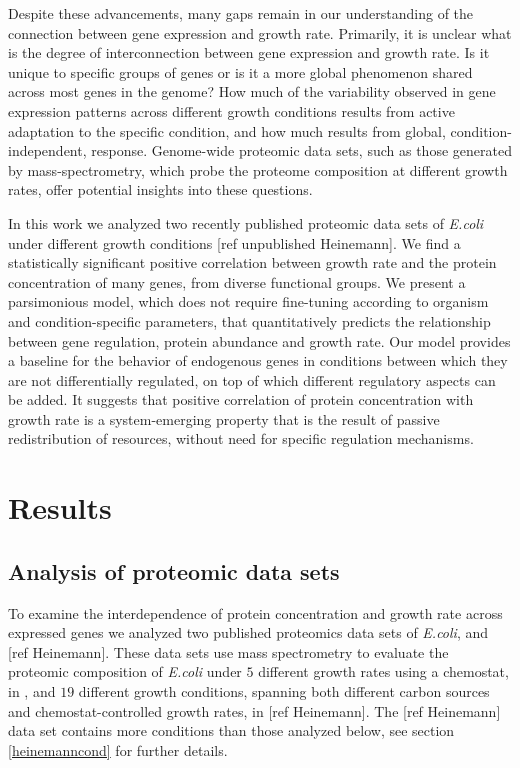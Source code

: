 \documentclass[notitlepage]{article}
\begin{document}
Despite these advancements, many gaps remain in our understanding of the connection between gene expression and growth rate.
Primarily, it is unclear what is the degree of interconnection between gene expression and growth rate.
Is it unique to specific groups of genes or is it a more global phenomenon shared across most genes in the genome?
How much of the variability observed in gene expression patterns across different growth conditions results from active adaptation to the specific condition, and how much results from global, condition-independent, response.
Genome-wide proteomic data sets, such as those generated by mass-spectrometry, which probe the proteome composition at different growth rates, offer potential insights into these questions.

In this work we analyzed two recently published proteomic data sets of \emph{E.coli} under different growth conditions \cite{Valgepea2013} [ref unpublished Heinemann].
We find a statistically significant positive correlation between growth rate and the protein concentration of many genes, from diverse functional groups.
We present a parsimonious model, which does not require fine-tuning according to organism and condition-specific parameters, that quantitatively predicts the relationship between gene regulation, protein abundance and growth rate.
Our model provides a baseline for the behavior of endogenous genes in conditions between which they are not differentially regulated, on top of which different regulatory aspects can be added.
It suggests that positive correlation of protein concentration with growth rate is a system-emerging property that is the result of passive redistribution of resources, without need for specific regulation mechanisms.

\section{Results}
\subsection{Analysis of proteomic data sets}
To examine the interdependence of protein concentration and growth rate across expressed genes we analyzed two published proteomics data sets of \emph{E.coli}, \cite{Valgepea2013} and [ref Heinemann].
These data sets use mass spectrometry to evaluate the proteomic composition of \emph{E.coli} under $5$ different growth rates using a chemostat, in \cite{Valgepea2013}, and $19$ different growth conditions, spanning both different carbon sources and chemostat-controlled growth rates, in [ref Heinemann].
The [ref Heinemann] data set contains more conditions than those analyzed below, see section \ref{heinemanncond} for further details.
\end{document}
